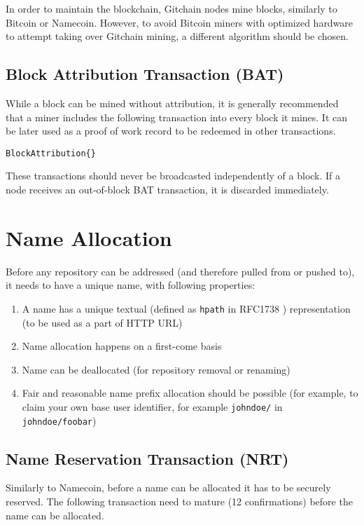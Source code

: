 \documentclass[a4paper]{article}
\begin{document}
In order to maintain the blockchain, Gitchain nodes mine blocks, similarly to Bitcoin or Namecoin. However, to avoid Bitcoin miners
with optimized hardware to attempt taking over Gitchain mining, a different algorithm should be chosen.

\subsection{Block Attribution Transaction (BAT)}

While a block can be mined without attribution, it is generally recommended that a miner includes the following transaction into every block it mines. It can be later used as a proof of work record to be redeemed in other transactions.

\begin{verbatim}
BlockAttribution{}
\end{verbatim}

These transactions should never be broadcasted independently of a block. If a node receives an out-of-block BAT transaction, it is discarded immediately.

\section{Name Allocation}

Before any repository can be addressed (and therefore pulled from or pushed to), it needs to have a unique name, with following properties:

\begin{enumerate}
\item A name has a unique textual (defined as \texttt{hpath} in RFC1738 \cite{rfc1738}) representation (to be used as a part of HTTP URL)
\item Name allocation happens on a first-come basis
\item Name can be deallocated (for repository removal or renaming)
\item Fair and reasonable name prefix allocation should be possible (for example, to claim your own base user identifier, for example \texttt{johndoe/} in \texttt{johndoe/foobar})
\end{enumerate}

\subsection{Name Reservation Transaction (NRT)}

Similarly to Namecoin, before a name can be allocated it has to be securely reserved. The following transaction need to mature (12 confirmations) before the name can be allocated.
\end{document}
